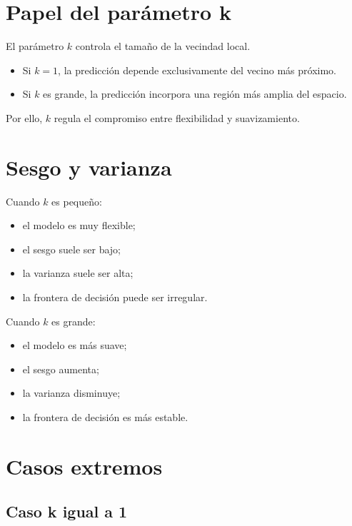 \documentclass[
  spanish,
  11pt,
  letterpaper,
  DIV=11,
  numbers=noendperiod]{scrreprt}
\providecommand{\tightlist}{%
  \setlength{\itemsep}{0pt}\setlength{\parskip}{0pt}}
\theoremstyle{definition}
\theoremstyle{plain}
\theoremstyle{definition}
\theoremstyle{remark}
\begin{document}
\section{Papel del parámetro k}\label{papel-del-paruxe1metro-k}

El parámetro \(k\) controla el tamaño de la vecindad local.

\begin{itemize}
\tightlist
\item
  Si \(k=1\), la predicción depende exclusivamente del vecino más
  próximo.
\item
  Si \(k\) es grande, la predicción incorpora una región más amplia del
  espacio.
\end{itemize}

Por ello, \(k\) regula el compromiso entre flexibilidad y suavizamiento.

\section{Sesgo y varianza}\label{sesgo-y-varianza-1}

Cuando \(k\) es pequeño:

\begin{itemize}
\tightlist
\item
  el modelo es muy flexible;
\item
  el sesgo suele ser bajo;
\item
  la varianza suele ser alta;
\item
  la frontera de decisión puede ser irregular.
\end{itemize}

Cuando \(k\) es grande:

\begin{itemize}
\tightlist
\item
  el modelo es más suave;
\item
  el sesgo aumenta;
\item
  la varianza disminuye;
\item
  la frontera de decisión es más estable.
\end{itemize}

\section{Casos extremos}\label{casos-extremos}

\subsection{Caso k igual a 1}\label{caso-k-igual-a-1}
\end{document}
